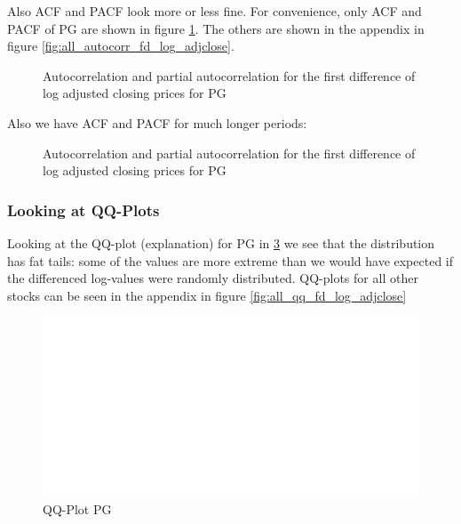 Also ACF and PACF look more or less fine. For convenience, only ACF and PACF of PG are shown in figure \ref{fig:PG_autocorr_fd_log_adjclose}. The others are shown in the appendix in figure \ref{fig:all_autocorr_fd_log_adjclose}.
\begin{figure}[H]
    \centering
    \begin{adjustbox}{width=.9\textwidth,center}
    
    \end{adjustbox}  
    \caption{Autocorrelation and partial autocorrelation for the first difference of log adjusted closing prices for PG}
    \label{fig:PG_autocorr_fd_log_adjclose}
\end{figure}{}

Also we have ACF and PACF for much longer periods: 
\begin{figure}[H]
    \centering
    \begin{adjustbox}{width=.9\textwidth,center}
    
    \end{adjustbox}  
    \caption{Autocorrelation and partial autocorrelation for the first difference of log adjusted closing prices for PG}
    \label{fig:PG_autocorr_fd_log_adjclose_all_lags}
\end{figure}{}




\subsubsection*{Looking at QQ-Plots}
Looking at the QQ-plot (explanation) for PG in \ref{fig:PG_qq_fd_log_adjclose} we see that the distribution has fat tails: some of the values are more extreme than we would have expected if the differenced log-values were randomly distributed. QQ-plots for all other stocks can be seen in the appendix in figure \ref{fig:all_qq_fd_log_adjclose}

\begin{figure}[h]
    \centering
    \begin{adjustbox}{width=.9\textwidth,center}
    \includegraphics[]{figures/PG_log_adjclose_fd_and_qq.pdf}
    \end{adjustbox}  
    \caption{QQ-Plot PG}
    \label{fig:PG_qq_fd_log_adjclose}
\end{figure}{}




